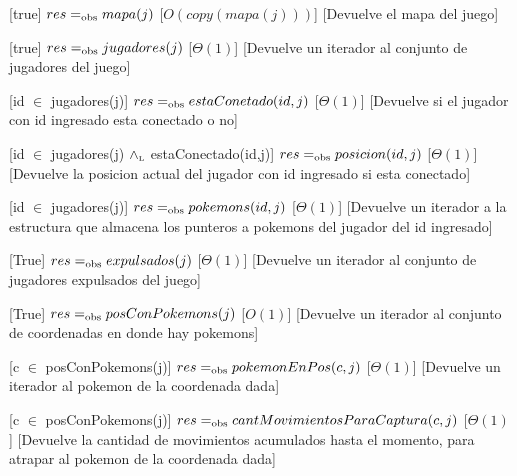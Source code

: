 \begin{Interfaz}
  [true]
  {$res =_{\mathrm{obs}} mapa(j)$}
  [$O(copy(mapa(j)))$]
  [Devuelve el mapa del juego]

  [true]
  {$res =_{\mathrm{obs}} jugadores(j)$}
  [$\Theta(1)$]
  [Devuelve un iterador al conjunto de jugadores del juego]

  [id $\in$ jugadores(j)]
  {$res =_{\mathrm{obs}} estaConetado(id,j)$}
  [$\Theta(1)$]
  [Devuelve si el jugador con id ingresado esta conectado o no]

  [id $\in$ jugadores(j) $\land_{\mathrm{\scriptscriptstyle{L}}}$ estaConectado(id,j)]
  {$res =_{\mathrm{obs}} posicion(id,j)$}
  [$\Theta(1)$]
  [Devuelve la posicion actual del jugador con id ingresado si esta conectado]

  [id $\in$ jugadores(j)]
  {$res =_{\mathrm{obs}} pokemons(id,j)$}
  [$\Theta(1)$]
  [Devuelve un iterador a la estructura que almacena los punteros a pokemons del jugador del id ingresado]

  [True]
  {$res =_{\mathrm{obs}} expulsados(j)$}
  [$\Theta(1)$]
  [Devuelve un iterador al conjunto de jugadores expulsados del juego]

  [True]
  {$res =_{\mathrm{obs}} posConPokemons(j)$}
  [$O(1)$]
  [Devuelve un iterador al conjunto de coordenadas en donde hay pokemons]

  [c $\in$ posConPokemons(j)]
  {$res =_{\mathrm{obs}} pokemonEnPos(c,j)$}
  [$\Theta(1)$] %
  [Devuelve un iterador al pokemon de la coordenada dada]

  [c $\in$ posConPokemons(j)]
  {$res =_{\mathrm{obs}} cantMovimientosParaCaptura(c,j)$}
  [$\Theta(1)$] %
  [Devuelve la cantidad de movimientos acumulados hasta el momento, para atrapar al pokemon de la coordenada dada]


\end{Interfaz}
